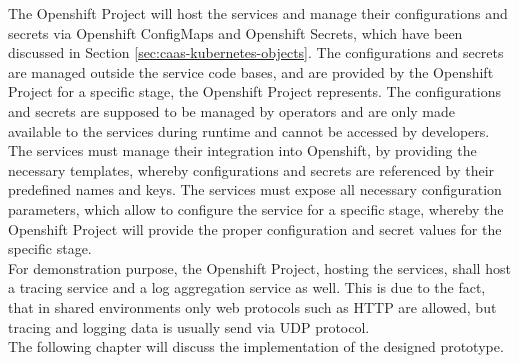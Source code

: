 The Openshift Project will host the services and manage their configurations and secrets via Openshift ConfigMaps and Openshift Secrets, which have been discussed in Section \vref{sec:caas-kubernetes-objects}. The configurations and secrets are managed outside the service code bases, and are provided by the Openshift Project for a specific stage, the Openshift Project represents. The configurations and secrets are supposed to be managed by operators and are only made available to the services during runtime and cannot be accessed by developers. \\

The services must manage their integration into Openshift, by providing the necessary templates, whereby configurations and secrets are referenced by their predefined names and keys. The services must expose all necessary configuration parameters, which allow to configure the service for a specific stage, whereby the Openshift Project will provide the proper configuration and secret values for the specific stage. \\

For demonstration purpose, the Openshift Project, hosting the services, shall host a tracing service and a log aggregation service as well. This is due to the fact, that in shared environments only web protocols such as HTTP are allowed, but tracing and logging data is usually send via UDP protocol. \\

The following chapter will discuss the implementation of the designed prototype. 
